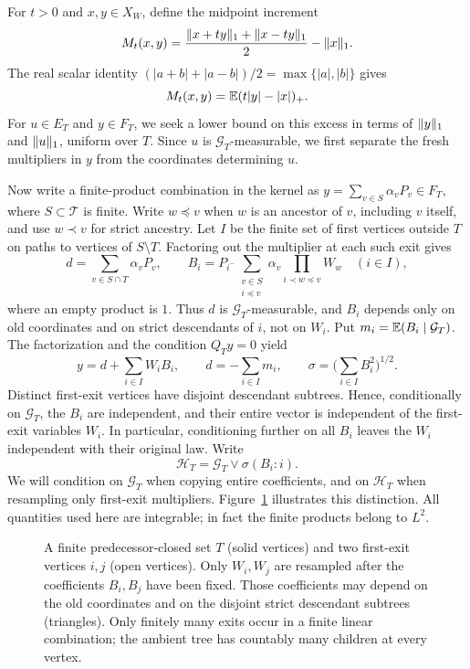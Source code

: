 For $t>0$ and $x,y\in X_W$, define the midpoint increment
\[
 M_t(x,y)=\frac{\lVert x+ty\rVert_1+\lVert x-ty\rVert_1}2-\lVert x\rVert_1.
\]
The real scalar identity
$(|a+b|+|a-b|)/2=\max\{|a|,|b|\}$ gives
\begin{equation}\label{prob:midpoint-identity}
 M_t(x,y)=\mathbb E(t|y|-|x|)_+.
\end{equation}
For $u\in E_T$ and $y\in F_T$, we seek a lower bound on this excess in
terms of $\lVert y\rVert_1$ and $\lVert u\rVert_1$, uniform over $T$. Since $u$ is
$\mathcal G_T$-measurable, we first separate the fresh multipliers in $y$
from the coordinates determining $u$.

Now write a finite-product combination in the kernel as
$y=\sum_{v\in S}\alpha_vP_v\in F_T$, where $S\subset\mathcal T$ is finite.
Write $w\preceq v$ when $w$ is an ancestor of $v$, including $v$ itself,
and use $w\prec v$ for strict ancestry. Let $I$ be the finite set of first
vertices outside $T$ on paths to vertices of $S\setminus T$. Factoring out
the multiplier at each such exit gives
\[
 d=\sum_{v\in S\cap T}\alpha_vP_v,\qquad
 B_i=P_{i^-}\sum_{\substack{v\in S\\i\preceq v}}
       \alpha_v\prod_{i\prec w\preceq v}W_w\quad(i\in I),
\]
where an empty product is $1$. Thus $d$ is $\mathcal G_T$-measurable, and
$B_i$ depends only on old coordinates and on strict descendants of $i$,
not on $W_i$. Put $m_i=\mathbb E(B_i\mid\mathcal G_T)$. The factorization and
the condition $Q_Ty=0$ yield
\begin{equation}\label{prob:first-exit}
 y=d+\sum_{i\in I}W_iB_i,\qquad d=-\sum_{i\in I}m_i,
 \qquad \sigma=\Big(\sum_{i\in I}B_i^2\Big)^{1/2}.
\end{equation}
Distinct first-exit vertices have disjoint descendant subtrees.
Hence, conditionally on $\mathcal G_T$,
the $B_i$ are independent, and their entire vector is independent of the
first-exit variables $W_i$.  In particular, conditioning further on all
$B_i$ leaves the $W_i$ independent with their original law.  Write
\[
 \mathcal H_T=\mathcal G_T\vee\sigma(B_i:i).
\]
We will condition on $\mathcal G_T$ when copying entire coefficients, and
on $\mathcal H_T$ when resampling only first-exit multipliers. Figure~\ref{fig:exit}
illustrates this distinction. All quantities
used here are integrable; in fact the finite products belong to $L^2$.

\begin{figure}[ht]
\centering

\caption{A finite predecessor-closed set $T$ (solid vertices) and two first-exit
vertices $i,j$ (open vertices). Only $W_i,W_j$ are resampled after the
coefficients $B_i,B_j$ have been fixed. Those coefficients may depend on the
old coordinates and on the disjoint strict descendant subtrees (triangles).
Only finitely many exits occur in a finite linear combination; the ambient tree
has countably many children at every vertex.}\label{fig:exit}
\end{figure}

